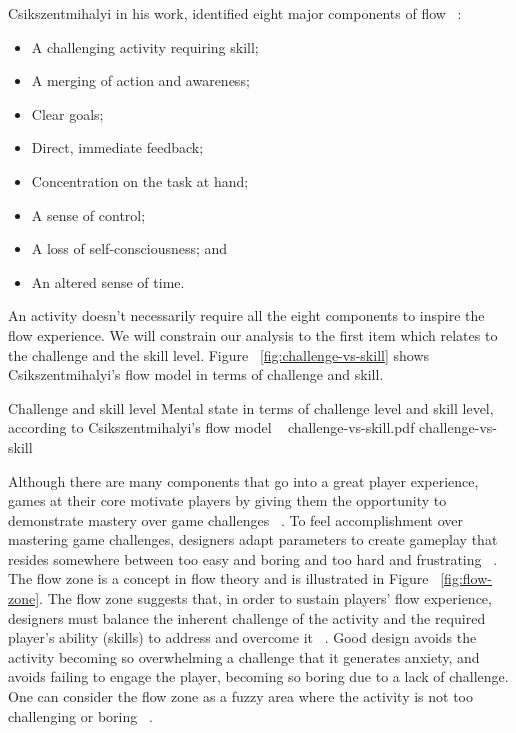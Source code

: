 Csikszentmihalyi in his work, identified eight major components of flow ~\cite{csikszentmihalyi1990flow}:

\begin{itemize}
\item A challenging activity requiring skill;
\item A merging of action and awareness;
\item Clear goals;
\item Direct, immediate feedback;
\item Concentration on the task at hand;
\item A sense of control;
\item A loss of self-consciousness; and
\item An altered sense of time.
\end{itemize}

An activity doesn't necessarily require all the eight components to inspire the flow experience. We will constrain our analysis to the first item which relates to the challenge and the skill level. Figure ~\ref{fig:challenge-vs-skill} shows Csikszentmihalyi's flow model in terms of challenge and skill.

\img
{Challenge and skill level}
{Mental state in terms of challenge level and skill level, according to Csikszentmihalyi's flow model ~\cite{csikszentmihalyi1997finding}}
{challenge-vs-skill.pdf}
{challenge-vs-skill}

Although there are many components that go into a great player experience, games at their core motivate players by giving them the opportunity to demonstrate mastery over game challenges ~\cite{ryan2006motivational}. To feel accomplishment over mastering game challenges, designers adapt parameters to create gameplay that resides somewhere between too easy and boring and too hard and frustrating ~\cite{koster2013theory}. The flow zone is a concept in flow theory and is illustrated in Figure ~\ref{fig:flow-zone}. The flow zone suggests that, in order to sustain players' flow experience, designers must balance the inherent challenge of the activity and the required player's ability (skills) to address and overcome it ~\cite{chen2007flow}. Good design avoids the activity becoming so overwhelming a challenge that it generates anxiety, and avoids failing to engage the player, becoming so boring due to a lack of challenge. One can consider the flow zone as a fuzzy area where the activity is not too challenging or boring ~\cite{csikszentmihalyi1990flow}.

